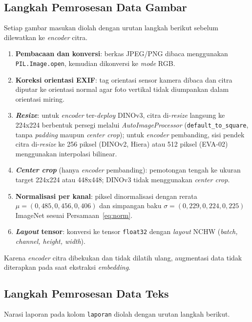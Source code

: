 \subsection{Langkah Pemrosesan Data Gambar}
\label{sec:img-preprocess}

Setiap gambar masukan diolah dengan urutan langkah berikut sebelum dilewatkan ke \textit{encoder} citra.

\begin{enumerate}
    \item \textbf{Pembacaan dan konversi}: berkas JPEG/PNG dibaca menggunakan \texttt{PIL.Image.open}, kemudian dikonversi ke \textit{mode} RGB.
    \item \textbf{Koreksi orientasi EXIF}: tag orientasi sensor kamera dibaca dan citra diputar ke orientasi normal agar foto vertikal tidak diumpankan dalam orientasi miring.
    \item \textbf{\textit{Resize}}: untuk \textit{encoder} ter-\textit{deploy} DINOv3, citra di-\textit{resize} langsung ke 224x224 berbentuk persegi melalui \textit{AutoImageProcessor} (\texttt{default\_to\_square}, tanpa \textit{padding} maupun \textit{center crop}); untuk \textit{encoder} pembanding, sisi pendek citra di-\textit{resize} ke 256 piksel (DINOv2, Hiera) atau 512 piksel (EVA-02) menggunakan interpolasi bilinear.
    \item \textbf{\textit{Center crop}} (hanya \textit{encoder} pembanding): pemotongan tengah ke ukuran target 224x224 atau 448x448; DINOv3 tidak menggunakan \textit{center crop}.
    \item \textbf{Normalisasi per kanal}: piksel dinormalisasi dengan rerata $\mu = (0{,}485, 0{,}456, 0{,}406)$ dan simpangan baku $\sigma = (0{,}229, 0{,}224, 0{,}225)$ ImageNet sesuai Persamaan~\ref{eq:norm}.
    \item \textbf{\textit{Layout} tensor}: konversi ke tensor \texttt{float32} dengan \textit{layout} NCHW (\textit{batch, channel, height, width}).
\end{enumerate}

Karena \textit{encoder} citra dibekukan dan tidak dilatih ulang, augmentasi data tidak diterapkan pada saat ekstraksi \textit{embedding}.

\subsection{Langkah Pemrosesan Data Teks}
\label{sec:txt-preprocess}

Narasi laporan pada kolom \texttt{laporan} diolah dengan urutan langkah berikut.

